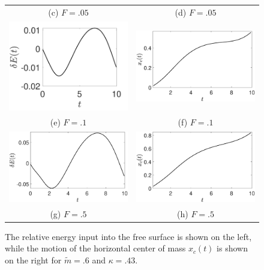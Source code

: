 \documentclass[a4paper,11pt]{article}
\begin{document}
\begin{figure}
\begin{tabular}{cc}
(c) $F=.05$ & (d) $F=.05$\\
 \includegraphics[width=.35\textwidth]{energy_wm_10_modu_pt6} & \includegraphics[width=.35\textwidth]{com_wm_10_modu_pt6}\\
(e) $F=.1$ & (f) $F=.1$\\
 \includegraphics[width=.35\textwidth]{energy_wm_50_modu_pt6} & \includegraphics[width=.35\textwidth]{com_wm_50_modu_pt6}\\
(g) $F=.5$ & (h) $F=.5$
\end{tabular}
\caption{The relative energy input into the free surface is shown on the left, while the motion of the horizontal center of mass $x_{c}(t)$ is shown on the right for $\tilde{m}=.6$ and $\kappa = .43$.}
\label{fig:midsolvorticity}
\end{figure}

\end{document}
